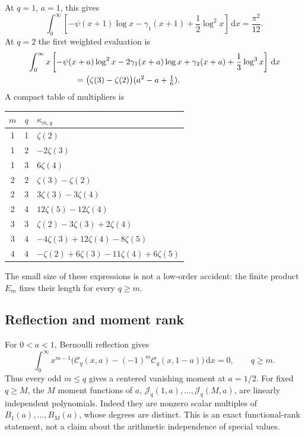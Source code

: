 \documentclass[11pt,letterpaper]{article}
\numberwithin{equation}{section}
\theoremstyle{definition}\newtheorem{definition}[theorem]{Definition}
\theoremstyle{remark}\newtheorem{remark}[theorem]{Remark}
\newcommand{\dd}{\,\mathrm{d}}
\newcommand{\Ccal}{\mathcal C}
\newcommand{\Jcal}{\mathcal J}
\begin{document}
At $q=1$, $a=1$, this gives
\begin{equation}\label{bsm:eq:pi12}
 \int_0^\infty\left[-\psi(x+1)\log x-\gamma_1(x+1)
                         +\frac12\log^2x\right]\dd x=\frac{\pi^2}{12}.
\end{equation}
At $q=2$ the first weighted evaluation is
\begin{align}\label{bsm:eq:weighted-C2}
 &\int_0^\infty x\left[-\psi(x+a)\log^2x
       -2\gamma_1(x+a)\log x+\gamma_2(x+a)
       +\frac13\log^3x\right]\dd x\notag\\
 &\hspace{20mm}=\bigl(\zeta(3)-\zeta(2)\bigr)
                                    (a^2-a+\tfrac16).
\end{align}
A compact table of multipliers is
\begin{center}
\begin{tabular}{cc l}
\toprule
$m$ & $q$ & $\kappa_{m,q}$\\
\midrule
1&1&$\zeta(2)$\\
1&2&$-2\zeta(3)$\\
1&3&$6\zeta(4)$\\
2&2&$\zeta(3)-\zeta(2)$\\
2&3&$3\zeta(3)-3\zeta(4)$\\
2&4&$12\zeta(5)-12\zeta(4)$\\
3&3&$\zeta(2)-3\zeta(3)+2\zeta(4)$\\
3&4&$-4\zeta(3)+12\zeta(4)-8\zeta(5)$\\
4&4&$-\zeta(2)+6\zeta(3)-11\zeta(4)+6\zeta(5)$\\
\bottomrule
\end{tabular}
\end{center}
The small size of these expressions is not a low-order accident: the
finite product $E_m$ fixes their length for every $q\ge m$.

\subsection{Reflection and moment rank}
For $0<a<1$, Bernoulli reflection gives
\begin{equation}\label{bsm:eq:reflection-moment}
 \int_0^\infty x^{m-1}
  \bigl(\Ccal_q(x,a)-(-1)^m\Ccal_q(x,1-a)\bigr)\dd x=0,
 \qquad q\ge m.
\end{equation}
Thus every odd $m\le q$ gives a centered vanishing moment at $a=1/2$.
For fixed $q\ge M$, the $M$ moment functions of $a$,
$\Jcal_q(1,a),\ldots,\Jcal_q(M,a)$, are linearly independent
polynomials. Indeed they are nonzero scalar multiples of
$B_1(a),\ldots,B_M(a)$, whose degrees are distinct. This is an exact
functional-rank statement, not a claim about the arithmetic independence
of special values.
\end{document}
